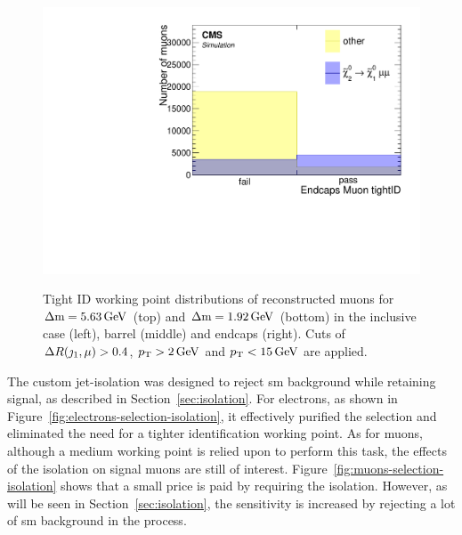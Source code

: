\begin{figure}[!htb]
\includegraphics[width=0.32\linewidth]{plots/lepton_selection/lepton_selection_dm1p92/none_Muons_endcape_tight.pdf} \\
\caption[tight ID working point distribution of reconstructed muons]{Tight ID working point distributions of reconstructed muons for $\Delta\mathrm{m}=5.63\,\text{Ge\hspace{-.08em}V}$ (top) and $\Delta\mathrm{m}=1.92\,\text{Ge\hspace{-.08em}V}$ (bottom) in the inclusive \pt case (left), barrel (middle) and endcaps (right). Cuts of $\Delta R(\jmath_1,\mu)>0.4$, $p_{\mathrm{T}}>2\,\text{Ge\hspace{-.08em}V}$ and $p_{\mathrm{T}}<15\,\text{Ge\hspace{-.08em}V}$ are applied.}
\label{fig:muons-selection-id-tight}
\end{figure}

The custom jet-isolation was designed to reject \gls{sm} background while retaining signal, as described in Section~\ref{sec:isolation}. For electrons, as shown in Figure~\ref{fig:electrons-selection-isolation}, it effectively purified the selection and eliminated the need for a tighter identification working point. As for muons, although a medium working point is relied upon to perform this task, the effects of the isolation on signal muons are still of interest. Figure~\ref{fig:muons-selection-isolation} shows that a small price is paid by requiring the isolation. However, as will be seen in Section~\ref{sec:isolation}, the sensitivity is increased by rejecting a lot of \gls{sm} background in the process.

